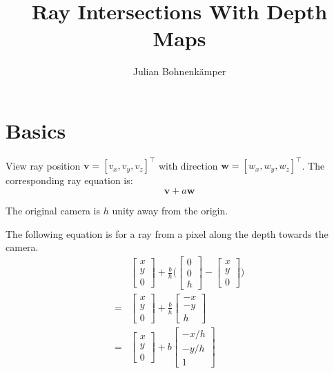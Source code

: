 \documentclass{article}
\title{Ray Intersections With Depth Maps}
\author{Julian Bohnenkämper}
\renewcommand{\vec}{\mathbf}
\begin{document}
\maketitle

\section{Basics}
View ray position $ \vec{v} = [v_x, v_y, v_z]^\top $ with direction $ \vec{w} = [w_x, w_y, w_z]^\top $.
The corresponding ray equation is:
$$
    \vec{v} + a \vec{w}
$$

The original camera is $ h $ unity away from the origin.

The following equation is for a ray from a pixel along the depth towards the camera.
\begin{align*}
    & \begin{bmatrix}
        x \\
        y \\
        0
    \end{bmatrix}
    +
    \frac{b}{h}
    \Bigg(
        \begin{bmatrix}
            0 \\
            0 \\
            h
        \end{bmatrix}
        -
        \begin{bmatrix}
            x \\
            y \\
            0
        \end{bmatrix}
    \Bigg)\\
    = & \begin{bmatrix}
        x \\
        y \\
        0
    \end{bmatrix}
    +
    \frac{b}{h}
    \begin{bmatrix}
        -x \\
        -y \\
        h
    \end{bmatrix}\\
    = & \begin{bmatrix}
        x \\
        y \\
        0
    \end{bmatrix}
    +
    b
    \begin{bmatrix}
        -x/h \\
        -y/h \\
        1
    \end{bmatrix}
\end{align*}
\end{document}
